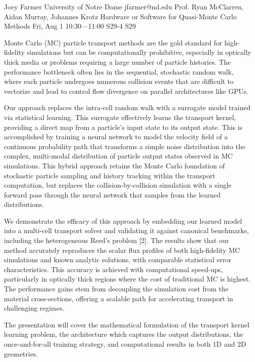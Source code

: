 \begin{talk}
  {Joey Farmer}%
  {University of Notre Dame}%
  {jfarmer@nd.edu}%
  {Prof. Ryan McClarren, Aidan Murray, Johannes Krotz}%
  {Hardware or Software for Quasi-Monte Carlo Methods}%
  {}%
  {Fri, Aug 1 10:30---11:00}%
  {S29-4}%
  {S29}%

Monte Carlo (MC) particle transport methods are the gold standard for high-fidelity simulations but can be computationally prohibitive, especially in optically thick media or problems requiring a large number of particle histories. The performance bottleneck often lies in the sequential, stochastic random walk, where each particle undergoes numerous collision events that are difficult to vectorize and lead to control flow divergence on parallel architectures like GPUs.

Our approach replaces the intra-cell random walk with a surrogate model trained via statistical learning. This surrogate effectively learns the transport kernel, providing a direct map from a particle's input state to its output state. This is accomplished by training a neural network to model the velocity field of a continuous probability path that transforms a simple noise distribution into the complex, multi-modal distribution of particle output states observed in MC simulations. This hybrid approach retains the Monte Carlo foundation of stochastic particle sampling and history tracking within the transport computation, but replaces the collision-by-collision simulation with a single forward pass through the neural network that samples from the learned distributions.

We demonstrate the efficacy of this approach by embedding our learned model into a multi-cell transport solver and validating it against canonical benchmarks, including the heterogeneous Reed's problem [2]. The results show that our method accurately reproduces the scalar flux profiles of both high-fidelity MC simulations and known analytic solutions, with comparable statistical error characteristics. This accuracy is achieved with  computational speed-ups, particularly in optically thick regions where the cost of traditional MC is highest. The performance gains stem from decoupling the simulation cost from the material cross-sections, offering a scalable path for accelerating transport in challenging regimes. 

The presentation will cover the mathematical formulation of the transport kernel learning problem, the architecture which captures the output distributions, the once-and-for-all training strategy, and computational  results in both 1D and 2D geometries.



\end{talk}
